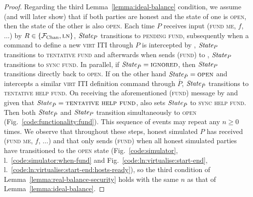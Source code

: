\begin{proof}
  Regarding the third Lemma~\ref{lemma:ideal-balance} condition, we assume (and
  will later show) that if both parties are honest and the state of one is
  \textsc{open}, then the state of the other is also \textsc{open}. Each time
  $P$ receives input (\textsc{fund me}, $f$, $\dots$) by $R \in \{\mathcal{F}_{\mathrm{Chan}},
  \textsc{ln}\}$, $\itistate_P$ transitions to \textsc{pending fund},
  subsequently when a command to define a new \textsc{virt} ITI through $P$ is
  intercepted by \fchan, $\itistate_P$ transitions to \textsc{tentative fund}
  and afterwards when \simulator sends (\textsc{fund}) to \fchan, $\itistate_P$
  transitions to \textsc{sync fund}. In parallel, if $\itistate_{\bar{P}} =
  \textsc{ignored}$, then $\itistate_P$ transitions directly back to
  \textsc{open}. If on the other hand $\itistate_{\bar{P}} = \textsc{open}$ and
  \fchan intercepts a similar \textsc{virt} ITI definition command through
  $\bar{P}$, $\itistate_{\bar{P}}$ transitions to \textsc{tentative help fund}.
  On receiving the aforementioned (\textsc{fund}) message by \simulator and
  given that $\itistate_{\bar{P}} = \textsc{tentative help fund}$, \fchan also
  sets $\itistate_{\bar{P}}$ to \textsc{sync help fund}. Then both
  $\itistate_{\bar{P}}$ and $\itistate_P$ transition simultaneously to
  \textsc{open} (Fig.~\ref{code:functionality:fund}). This sequence of events
  may repeat any $n \geq 0$ times. We observe that throughout these steps,
  honest simulated $P$ has received (\textsc{fund me}, $f$, $\dots$) and that
  \simulator only sends (\textsc{fund}) when all honest simulated parties have
  transitioned to the \textsc{open} state (Fig.~\ref{code:simulator},
  l.~\ref{code:simulator:when-fund} and Fig.~\ref{code:ln:virtualise:start-end},
  l.~\ref{code:ln:virtualise:start-end:hosts-ready}), so the third condition of
  Lemma~\ref{lemma:real-balance-security} holds with the same $n$ as that of
  Lemma~\ref{lemma:ideal-balance}.


\end{proof}
